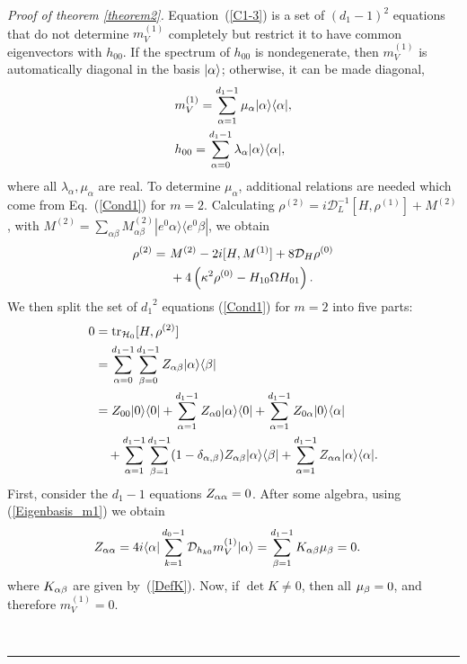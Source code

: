 \documentclass[aps,pra,letterpaper,twocolumn,showpacs,superscriptaddress,floatfix,longbibliography]{revtex4-1}
\newcommand{\traccazero}{\mathop{\mathrm{tr}_{\mathcal{H}_0}}\limits}
\newcommand{\eket}[2]{|e^#1 #2 \rangle}
\newcommand{\ebra}[2]{\langle e^#1 #2|}
\newenvironment{proof}[1][Proof]{\noindent\textit{#1.} }{\
  \rule{0.5em}{0.5em}}
\begin{document}
\begin{proof}[Proof of theorem \ref{theorem2}]
  Equation~(\ref{C1-3}) is a set of $(d_1-1)^2$ equations that do not
  determine $m^{(1)}_V$ completely but restrict it to have common
  eigenvectors with $h_{00}$. If the spectrum of $h_{00}$ is
  nondegenerate, then $m^{(1)}_V$ is automatically diagonal in the
  basis $|{\alpha}\rangle$; otherwise, it can be made diagonal,
  \begin{align}
    &m^{(1)}_V= \sum_{\alpha=1}^{d_1-1} \mu_\alpha |{\alpha}\rangle\langle{\alpha}|,
    \label{Eigenbasis_m1}\\
    &h_{00}=\sum_{\alpha=0}^{d_1-1} \lambda_\alpha |{\alpha}\rangle\langle{\alpha}|,
  \end{align}
  where all $\lambda_\alpha,\mu_\alpha$ are real.  To determine
  $\mu_\alpha$, additional relations are needed which come from
  Eq.~(\ref{Cond1}) for $m=2$. Calculating $\rho^{(2)}=i
  \mathcal{D}_L^{-1}[H,\rho^{(1)}]+M^{(2)}$, with $M^{(2)}=
  \sum_{\alpha \beta} M^{(2)}_{\alpha \beta} \eket{0}{\alpha}
  \ebra{0}{\beta}$, we obtain
  \begin{align}
    \rho^{(2)} =\ & M^{(2)} - 2 i [H,M^{(1)}]+ 8 \mathcal{D}_H
    \rho^{(0)} \nonumber \\ & + 4 \left( \kappa^2\rho^{(0)} - H_{10}\Omega
      H_{01} \right)\label{Res_ro2}.
  \end{align}
  We then split the set of ${d_1}^2$ equations (\ref{Cond1}) for $m=2$
  into five parts:
  \begin{align}
    0 &= \traccazero [H, \rho^{(2)}] \nonumber \\ &=
    \sum_{\alpha=0}^{d_1-1}\sum_{\beta=0}^{d_1-1} Z_{\al\be}
    \ketbra{\al}{\be} \nonumber \\ &= Z_{0 0} \ketbra{0}{0}
    +\sum_{\al=1}^{d_1-1} Z_{\al 0} \ketbra{\al}{0}
    +\sum_{\al=1}^{d_1-1} Z_{0 \al} \ketbra{0}{\al} \nonumber \\
    &\quad + \sum_{\al=1}^{d_1-1} \sum_{\be=1}^{d_1-1}
    (1-\delta_{\al,\be}) Z_{\al\be} \ketbra{\al}{\be}
    +\sum_{\al=1}^{d_1-1} Z_{\al\al} \ketbra{\al}{\al}.
    \label{Zsplitting}
  \end{align}
  First, consider the $d_1-1$ equations $Z_{\alpha\alpha}=0$. After some
  algebra, using (\ref{Eigenbasis_m1}) we obtain
  \begin{align}
    & Z_{\alpha\alpha}= 4 i \langle{\alpha}| \sum_{k=1}^{d_0-1}
    \mathcal{D}_{h_{k0}} m^{(1)}_V |{\alpha}\rangle = \sum_{\beta=1}^{d_1-1}
    K_{\alpha \beta} \mu_\beta=0.
    \label{Eq Cond2diag}
  \end{align}
  where $K_{\alpha \beta}$ are given by~(\ref{DefK}). Now, if $\det K\neq
  0$, then all $\mu_\beta=0$, and therefore $m^{(1)}_V=0$.


\end{proof}
\end{document}
